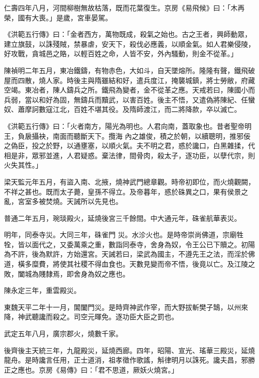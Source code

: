 \begin{pinyinscope}
 仁壽四年八月，河間柳樹無故枯落，既而花葉復生。京房《易飛候》曰：「木再榮，國有大喪。」是歲，宮車晏駕。



 《洪範五行傳》曰：「金者西方，萬物既成，殺氣之始也。古之王者，興師動眾，建立旗鼓，以誅殘賊，禁暴虐，安天下，殺伐必應義，以順金氣。如人君樂侵陵，好攻戰，貪城邑之賂，以輕百姓之命，人皆不安，外內騷動，則金不從革。」



 陳禎明二年五月，東冶鐵鑄，有物赤色，大如斗，自天墜熔所。隆隆有聲，鐵飛破屋而四散，燒人家。時後主與隋雖結和好，遣兵度江，掩襲城鎮，將士勞敝，府藏空竭。東冶者，陳人鑄兵之所。鐵飛為變者，金不從革之應。天戒若曰，陳國小而兵弱，當以和好為固，無鑄兵而黷武，以害百姓。後主不悟，又遣偽將陳紀、任蠻奴、蕭摩訶數寇江北，百姓不堪其役。及隋師渡江，而二將降款，卒以滅亡。



 《洪範五行傳》曰：「火者南方，陽光為明也。人君向南，蓋取象也。昔者聖帝明王，負扆攝袂，南面而聽斷天下。攬海
 內之雄俊，積之於朝，以續聰明，推邪佞之偽臣，投之於野，以通壅塞，以順火氣。夫不明之君，惑於讒口，白黑雜揉，代相是非，眾邪並進，人君疑惑。棄法律，間骨肉，殺太子，逐功臣，以孽代宗，則火失其性。」



 梁天監元年五月，有盜入南、北掖，燒神武門總章觀。時帝初即位，而火燒觀闕，不祥之甚也。既而太子薨，皇孫不得立。及帝暮年，惑於硃異之口，果有侯景之亂，宮室多被焚燒。天誡所以先見也。



 普通二年五月，琬琰殿火，延燒後宮三千餘間。中大通元年，硃雀航華表災。



 明年，同泰寺災。大同三年，硃雀門
 災。水沴火也。是時帝崇尚佛道，宗廟牲牷，皆以面代之，又委萬乘之重，數詣同泰寺，舍身為奴，令王公已下贖之。初陽為不許，後為默許，方始還宮。天誡若曰，梁武為國主，不遵先王之法，而淫於佛道，橫多糜費，將使其社稷不得血食也。天數見變而帝不悟，後竟以亡。及江陵之敗，闔城為賤隸焉，即舍身為奴之應也。



 陳永定三年，重雲殿災。



 東魏天平二年十一月，閶闔門災。是時齊神武作宰，而大野拔斬樊子鵠，以州來降，神武聽讒而殺之。司空元暉免。逐功臣大臣之罰也。



 武定五年八月，廣宗郡火，燒數千家。



 後齊後主天統三年，九龍殿災，延燒西廊。四年，昭陽、宣光、瑤華三殿災，延燒龍舟。是時讒言任用，正士道消，祖孝徵作歌謠，斛律明月以誅死。讒夫昌，邪勝正之應也。京房《易傳》曰：「君不思道，厥妖火燒宮。」




\end{pinyinscope}
